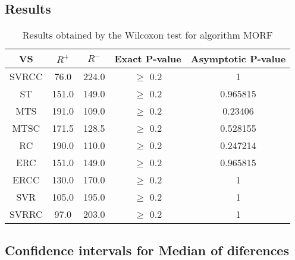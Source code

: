 \documentclass[a4paper,10pt]{article}
\begin{document}
\subsection{Results}

\begin{table}[!htp]
\centering\small
\begin{tabular}{
|c|c|c|c|c|}
\hline
 VS & $R^{+}$ & $R^{-}$ & Exact P-value & Asymptotic P-value \\ \hline 
SVRCC & 76.0 & 224.0 & $\geq$ 0.2 & 1\\ \hline 
ST & 151.0 & 149.0 & $\geq$ 0.2 & 0.965815\\ \hline 
MTS & 191.0 & 109.0 & $\geq$ 0.2 & 0.23406\\ \hline 
MTSC & 171.5 & 128.5 & $\geq$ 0.2 & 0.528155\\ \hline 
RC & 190.0 & 110.0 & $\geq$ 0.2 & 0.247214\\ \hline 
ERC & 151.0 & 149.0 & $\geq$ 0.2 & 0.965815\\ \hline 
ERCC & 130.0 & 170.0 & $\geq$ 0.2 & 1\\ \hline 
SVR & 105.0 & 195.0 & $\geq$ 0.2 & 1\\ \hline 
SVRRC & 97.0 & 203.0 & $\geq$ 0.2 & 1\\ \hline 

\end{tabular}
\caption{Results obtained by the Wilcoxon test for algorithm MORF}
\end{table}

\subsection{Confidence intervals for Median of diferences}
\end{document}
